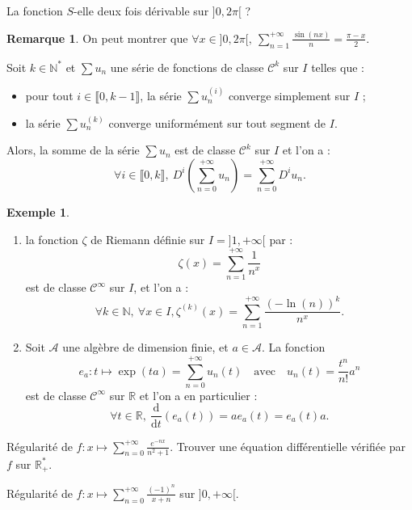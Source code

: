 \documentclass[french]{article}
\newcommand{\N}{\mathbb{N}}
\newcommand{\R}{\mathbb{R}}
\newcommand{\st}{^*}
\renewcommand{\d}{\text{d}}
\theoremstyle{plain}
\theoremstyle{definition}
\newtheorem*{ex}{Exemple}
\newtheorem*{rmq}{Remarque}
\theoremstyle{remark}
\begin{document}
\begin{exo}
	La fonction $S$-elle deux fois dérivable sur $]0,2\pi[$ ?
\end{exo}

\begin{rmq}
	On peut montrer que $\forall x\in]0,2\pi[,\ \displaystyle\sum_{n=1}^{+\infty}\frac{\sin(nx)}{n}=\frac{\pi-x}{2}$.
\end{rmq}

\begin{cor}%
	Soit $k\in\N\st$ et $\displaystyle\sum u_n$ une série de fonctions de classe $\mathcal{C}^k$ sur $I$ telles que :
	\begin{itemize}
		\item pour tout $i\in\llbracket0,k-1\rrbracket$, la série $\displaystyle\sum u_n^{(i)}$ converge simplement sur $I$ ;
		\item la série $\displaystyle\sum u_n^{(k)}$ converge uniformément sur tout segment de $I$.
	\end{itemize}
	Alors, la somme de la série $\displaystyle\sum u_n$ est de classe $\mathcal{C}^k$ sur $I$ et l'on a :
	$$\forall i\in\llbracket0,k\rrbracket,\ D^i\left(\sum_{n=0}^{+\infty}u_n\right)=\sum_{n=0}^{+\infty}D^iu_n.$$
\end{cor}

\begin{ex}
	\begin{enumerate}
		\item la fonction $\zeta$ de Riemann définie sur $I=]1,+\infty[$ par :
		$$\zeta(x)=\sum_{n=1}^{+\infty}\frac{1}{n^x}$$ est de classe $\mathcal{C}^\infty$ sur $I$, et l'on a :
		$$\forall k\in\N,\ \forall x\in I, \zeta^{(k)}(x)=\sum_{n=1}^{+\infty}\frac{(-\ln(n))^k}{n^x}.$$
		\item Soit $\mathcal{A}$ une algèbre de dimension finie, et $a\in\mathcal{A}$. La fonction $$e_a:t\mapsto\exp(ta)=\sum_{n=0}^{+\infty}u_n(t)\quad\text{avec}\quad u_n(t)=\frac{t^n}{n!}a^n$$ est de classe $\mathcal{C}^\infty$ sur $\R$ et l'on a en particulier :
		$$\forall t\in\R,\ \frac{\d}{\d t}(e_a(t))=ae_a(t)=e_a(t)a.$$ 
	\end{enumerate}
\end{ex}

\begin{exo}
	Régularité de $f:x\mapsto\displaystyle\sum_{n=0}^{+\infty}\frac{e^{-nx}}{n^2+1}$. Trouver une équation différentielle vérifiée par $f$ sur $\R_+\st$.
\end{exo}

\begin{exo}
	Régularité de $f:x\mapsto\displaystyle\sum_{n=0}^{+\infty}\frac{(-1)^n}{x+n}$ sur $]0,+\infty[$.
\end{exo}
\end{document}
